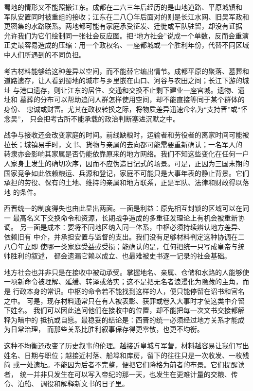 蜀地的情形又不能照搬江东。成都在二六三年后经历的是山地道路、平原城镇和
军队安置同时被重组的接收；江东在二八〇年后面对的则是长江水网、旧吴军政和
更密集的水路联系。两地都可能有家庭承受征发、迁徙或军队驻留，却没有证据
允许我们为它们绘制同一张社会反应图。把“地方社会”说成一个单数，反而会重演
正史最容易造成的压缩：用一个政权名、一座都城或一个胜利年份，代替不同区域
中人们所遇到的不同负担。

考古材料能够给这种差异以空间，而不能替它编出情节。成都平原的聚落、墓葬和
道路遗存，让人看到蜀地的城市与乡里嵌在山口、河谷与农田之间；长江下游的城址
与港口遗存，则让江东的居住、交通和交换不止剩下建业一座宫城。遗物、遗址和
墓葬的分布可以帮助追问人群怎样使用空间，却不能直接等同于某个群体的身份、
忠诚或财富。尤其在政权转换之际，将物质差异迅速命名为“支持晋”或“怀念吴”，
只会把考古所不能承载的政治判断塞进沉默之中。

战争与接收还会改变家庭的时间。前线缺粮时，运输者和劳役者的离家时间可能被
拉长；城镇易手时，文书、货物与亲属的去向都可能需要重新确认；一名军人的
转隶亦会影响其家属是否仍能依靠原来的地方网络。我们不知这些变化在任何一户
人家身上发生的确切次序，因而不应伪造日记式的场景。可是，正因为三国末期的
国家竞争如此依赖粮运、兵源和登记，家庭不可能只是大事年表的静止背景。它们
承担的劳役、保有的土地、维持的亲属和地方联系，正是军队、法律和财政得以落地
的条件。

西晋统一的制度得失也由此显出两面。一面是利益：原先相互封锁的区域可以在同一
最高名义下交换命令和资源，长期战争造成的多重征发理论上有机会被重新协调。
另一面是成本：要将不同地区纳入同一体系，中枢必须持续辨认地方差异、依赖旧有
中介，并承担安置与监督的支出。我们没有足够材料判定这种协调在二八〇年立即
使哪一类家庭受益或受损；能确认的是，任何把统一只写成皇帝与统帅胜利的叙述，
都会遗漏它赖以成立、也最难被史书逐一记录的社会基础。

地方社会也并非只是在接收中被动承受。掌握地名、亲属、仓储和水路的人能够使
一项新命令被理解、延缓、转译或落实；这不是把无名者浪漫化为隐藏的主角，而是
行政本身的常识。中枢的命令若不能找到这样的人，便只能停留在诏书和官名之中。
可是，现存材料通常只在有人被表彰、获罪或卷入大事时才使这类中介留下姓名。
我们可以因此追问他们在接收中的位置，却不能把每一次文书交接都解释为暗中的
抵抗或自愿。最稳妥的结论是：西晋的统一必须经过地方关系才能成为日常治理，
而那些关系比胜利叙事保存得更零散，也更不均衡。

这种不均衡还改变了历史叙事的伦理。越接近皇城与军营，材料越容易让我们写出
姓名、日期与职位；越接近村落、船埠和库房，留下的往往只是一次收发、一枚残简
或一处遗址。不能因为后者不完整，便把它们降格为前者的布景。它们提醒读者，
统一并非只发生在可以写入帝纪的那一天，也发生在更难计量的交粮、传令、泊船、
调役和解释新文书的日子里。

